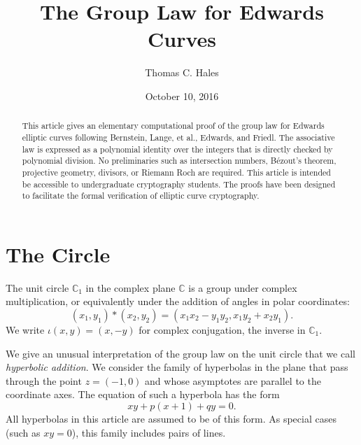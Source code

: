 \documentclass[12pt]{article}
\title{The Group Law for Edwards Curves}
\author{Thomas C. Hales}
\date{October 10, 2016}
\newcommand{\ring}[1]{\mathbb{#1}}
\begin{document}
\maketitle

\begin{abstract} 
  This article gives an elementary computational proof of the group
  law for Edwards elliptic curves following  Bernstein, Lange, et al.,
  Edwards, and Friedl.  The associative law is expressed as a polynomial
  identity over the integers that is directly checked by polynomial division.
  No preliminaries such as intersection numbers, 
  B\'ezout's theorem, projective geometry, divisors,
  or Riemann Roch are required. This article is intended be accessible to
  undergraduate cryptography students.  The proofs have been designed
  to facilitate the formal verification of elliptic curve cryptography.
\end{abstract}

\baselineskip
{}\baselineskip

\newenvironment{blockquote}{%
  \par%
  \medskip%
  \baselineskip=0.7\baselineskip%
  \leftskip=2em\rightskip=2em%
  \noindent\ignorespaces}{%
  \par\medskip}


\section{The Circle}

The unit circle $\ring{C}_1$ in the complex plane $\ring{C}$ is a
group under complex multiplication, or equivalently under the addition
of angles in polar coordinates:
\begin{equation}\label{eqn:cx}
(x_1,y_1) * (x_2,y_2) = (x_1 x_2 - y_1 y_2,x_1 y_2 + x_2 y_1).
\end{equation}
We write $\iota(x,y) = (x,-y)$ for complex conjugation, the inverse in
$\ring{C}_1$.

We give an unusual interpretation of the group law on the unit circle
that we call {\it hyperbolic addition}.  We consider the family of
hyperbolas in the plane that pass through the point $z=(-1,0)$ and
whose asymptotes are parallel to the coordinate axes.  The equation of
such a hyperbola has the form
\begin{equation}\label{eqn:hyp}
x y + p (x+1) + q y = 0.
\end{equation}
All hyperbolas in this article are assumed to be of this form.  As
special cases (such as $x y=0$), this family includes pairs of lines.
 
\end{document}
